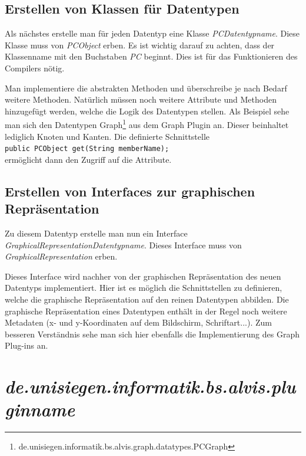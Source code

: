 \documentclass[10pt,a4paper]{article}
\begin{document}
\subsection{Erstellen von Klassen für Datentypen}
Als nächstes erstelle man für jeden Datentyp eine Klasse \emph{PCDatentypname}. Diese Klasse muss von \emph{PCObject} erben.
Es ist wichtig darauf zu achten, dass der Klassenname mit den Buchstaben \emph{PC} beginnt. Dies ist für das Funktionieren des Compilers nötig.

\lstset{language=java}


Man implementiere die abstrakten Methoden und überschreibe je nach Bedarf weitere Methoden. Natürlich müssen noch weitere Attribute und Methoden hinzugefügt werden, welche die Logik des Datentypen stellen.
Als Beispiel sehe man sich den Datentypen Graph\footnote{de.unisiegen.informatik.bs.alvis.graph.datatypes.PCGraph} aus dem Graph Plugin an. Dieser beinhaltet lediglich Knoten und Kanten. 
Die definierte Schnittstelle\\
\lstinline{public PCObject get(String memberName);}\\
ermöglicht dann den Zugriff auf die Attribute.

\subsection{Erstellen von Interfaces zur graphischen Repräsentation}
Zu diesem Datentyp erstelle man nun ein Interface \emph{GraphicalRepresentationDatentypname}. Dieses Interface muss von \emph{GraphicalRepresentation} erben.

\lstset{language=java}


Dieses Interface wird nachher von der graphischen Repräsentation des neuen Datentyps implementiert. Hier ist es möglich die Schnittstellen zu definieren, welche die graphische Repräsentation auf den reinen Datentypen abbilden. Die graphische Repräsentation eines Datentypen enthält in der Regel noch weitere Metadaten (x- und y-Koordinaten auf dem Bildschirm, Schriftart...). Zum besseren Verständnis sehe man sich hier ebenfalls die Implementierung des Graph Plug-ins an.

\section{\emph{de.unisiegen.informatik.bs.alvis.pluginname}}
\end{document}
